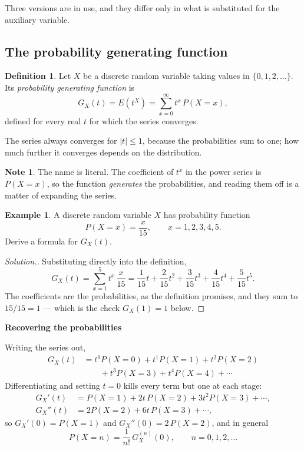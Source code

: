 \documentclass[11pt,a4paper]{article}
\theoremstyle{definition}
\newtheorem{defn}[thm]{Definition}
\newtheorem{exa}[thm]{Example}
\newtheorem*{note}{Note}
\newenvironment{solution}
  {\renewcommand{\qedsymbol}{}\begin{proof}[\textit{Solution}.]}
  {\end{proof}}
\newcommand{\subhead}[1]{%
  \par\medskip\noindent\textbf{#1}\par\nobreak\smallskip}
\begin{document}
Three versions are in use, and they differ only in what is substituted for the
auxiliary variable.

\subsection{The probability generating function}

\begin{defn}
Let $X$ be a discrete random variable taking values in
$\{0,1,2,\dots\}$. Its \emph{probability generating function} is
$$G_X(t) = E\left(t^{X}\right) = \sum_{x=0}^{\infty} t^{x}\,P(X=x),$$
defined for every real $t$ for which the series converges.
\end{defn}

The series always converges for $\left|t\right|\leq 1$, because the
probabilities sum to one; how much further it converges depends on the
distribution.

\begin{note}
The name is literal. The coefficient of $t^{x}$ in the power series is
$P(X=x)$, so the function \emph{generates} the probabilities, and reading them
off is a matter of expanding the series.
\end{note}

\begin{exa}
A discrete random variable $X$ has probability function
$$P(X=x) = \frac{x}{15},\qquad x = 1,2,3,4,5 .$$
Derive a formula for $G_X(t)$.
\end{exa}

\begin{solution}
Substituting directly into the definition,
$$G_X(t) = \sum_{x=1}^{5} t^{x}\,\frac{x}{15}
= \frac{1}{15}t + \frac{2}{15}t^{2} + \frac{3}{15}t^{3}
+ \frac{4}{15}t^{4} + \frac{5}{15}t^{5}.$$
The coefficients are the probabilities, as the definition promises, and they
sum to $15/15 = 1$ --- which is the check $G_X(1)=1$ below.
\end{solution}

\subhead{Recovering the probabilities}
Writing the series out,
\begin{align*}
G_X(t) &= t^{0}P(X=0) + t^{1}P(X=1) + t^{2}P(X=2) \\
&\qquad + t^{3}P(X=3) + t^{4}P(X=4) + \cdots
\end{align*}
Differentiating and setting $t=0$ kills every term but one at each stage:
\begin{align*}
G_X'(t) &= P(X=1) + 2t\,P(X=2) + 3t^{2}P(X=3) + \cdots , \\
G_X''(t) &= 2P(X=2) + 6t\,P(X=3) + \cdots ,
\end{align*}
so $G_X'(0) = P(X=1)$ and $G_X''(0) = 2\,P(X=2)$,
and in general
$$P(X=n) = \frac{1}{n!}\,G_X^{(n)}(0),\qquad n = 0,1,2,\dots$$
\end{document}
